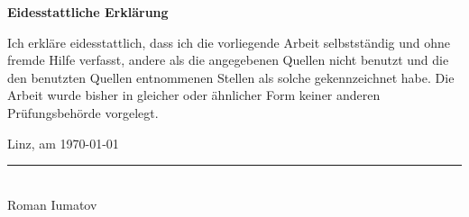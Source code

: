 
\clearpage %
\thispagestyle{plain} %

\vspace*{4cm} %

{\centering %
	\fontsize{18pt}{22pt}\selectfont %
	\bfseries %
	Eidesstattliche Erklärung\par
}

\vspace{3em} %

\noindent %
Ich erkläre eidesstattlich, dass ich die vorliegende Arbeit selbstständig und ohne fremde Hilfe verfasst, andere als die angegebenen Quellen nicht benutzt und die den benutzten Quellen entnommenen Stellen als solche gekennzeichnet habe. Die Arbeit wurde bisher in gleicher oder ähnlicher Form keiner anderen Prüfungsbehörde vorgelegt.

\vspace{6em} %

\noindent %
\begin{minipage}[t]{0.45\textwidth} %
	\vspace{0pt} %
	Linz, am \today
\end{minipage}%
\hfill %
\begin{minipage}[t]{0.45\textwidth} %
	\raggedleft %
	\rule{6cm}{0.4pt} \\ %
	\vspace{0.5em} %
	Roman Iumatov
\end{minipage}


